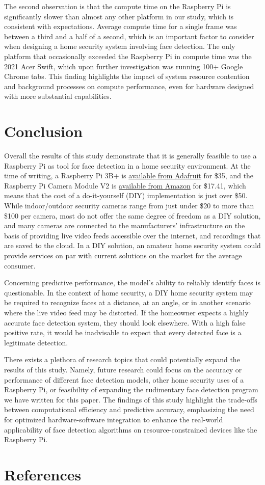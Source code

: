 \documentclass[conference]{IEEEtran}
\begin{document}
The second observation is that the compute time on the Raspberry Pi is significantly slower than almost any other platform in our study, which is consistent with expectations. Average compute time for a single frame was between a third and a half of a second, which is an important factor to consider when designing a home security system involving face detection. The only platform that occasionally exceeded the Raspberry Pi in compute time was the 2021 Acer Swift, which upon further investigation was running 100+ Google Chrome tabs. This finding highlights the impact of system resource contention and background processes on compute performance, even for hardware designed with more substantial capabilities.

\section{Conclusion}

Overall the results of this study demonstrate that it is generally feasible to use a Raspberry Pi as tool for face detection in a home security environment. At the time of writing, a Raspberry Pi 3B+ is \href{https://www.adafruit.com/product/3775?src=raspberrypi}{available from Adafruit} for \$35, and the Raspberry Pi Camera Module V2 is \href{https://a.co/d/0I5FcZJ}{available from Amazon} for \$17.41, which means that the cost of a do-it-yourself (DIY) implementation is just over \$50. While indoor/outdoor security cameras range from just under \$20 to more than \$100 per camera, most do not offer the same degree of freedom as a DIY solution, and many cameras are connected to the manufacturers' infrastructure on the basis of providing live video feeds accessible over the internet, and recordings that are saved to the cloud. In a DIY solution, an amateur home security system could provide services on par with current solutions on the market for the average consumer. 

Concerning predictive performance, the model's ability to reliably identify faces is questionable. In the context of home security, a DIY home security system may be required to recognize faces at a distance, at an angle, or in another scenario where the live video feed may be distorted. If the homeowner expects a highly accurate face detection system, they should look elsewhere. With a high false positive rate, it would be inadvisable to expect that every detected face is a legitimate detection.

There exists a plethora of research topics that could potentially expand the results of this study. Namely, future research could focus on the accuracy or performance of different face detection models, other home security uses of a Raspberry Pi, or feasibility of expanding the rudimentary face detection program we have written for this paper. The findings of this study highlight the trade-offs between computational efficiency and predictive accuracy, emphasizing the need for optimized hardware-software integration to enhance the real-world applicability of face detection algorithms on resource-constrained devices like the Raspberry Pi.
\section{References}
\renewcommand{\refname}{}  %


\vspace{12pt}
\end{document}
